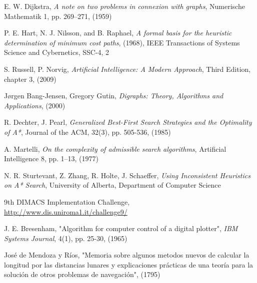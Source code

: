 \documentclass[a4paper,10pt]{report}
\begin{document}
\begin{thebibliography}{99}

 E. W. Dijkstra, \textsl{A note on two problems in connexion with graphs}, Numerische Mathematik 1, pp. 269–271, (1959)

 P. E. Hart, N. J. Nilsson, and B. Raphael, \textsl{A formal basis for the heuristic determination of minimum cost paths}, (1968), IEEE Transactions of Systems Science and Cybernetics, SSC-4, 2

 S. Russell, P. Norvig, \textsl{Artificial Intelligence: A Modern Approach}, Third Edition, chapter 3, (2009)

 Jørgen Bang-Jensen, Gregory Gutin, \textsl{Digraphs: Theory, Algorithms and Applications}, (2000)

 R. Dechter, J. Pearl, \textsl{Generalized Best-First Search Strategies and the Optimality of A*}, Journal of the ACM, 32(3), pp. 505-536, (1985)

 A. Martelli, \textsl{On the complexity of admissible search algorithms}, Artificial Intelligence 8, pp. 1–13, (1977)

 N. R. Sturtevant, Z. Zhang, R. Holte, J. Schaeffer, \textsl{Using Inconsistent Heuristics on A* Search}, University of Alberta, Department of Computer Science

 9th DIMACS Implementation Challenge,\\
\url{http://www.dis.uniroma1.it/challenge9/}

 J. E. Bresenham, "Algorithm for computer control of a digital plotter", \textsl{IBM Systems Journal}, 4(1), pp. 25-30, (1965)

 José de Mendoza y Ríos, "Memoria sobre algunos metodos nuevos de calcular la longitud por las distancias lunares y explicaciones prácticas de una teoría para la solución de otros problemas de navegación", (1795)

\end{thebibliography}
\end{document}
